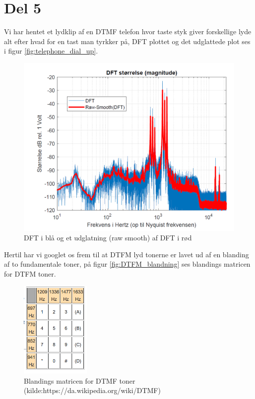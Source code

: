 \section{Del 5}

Vi har hentet et lydklip af en DTMF telefon hvor taste styk giver forskellige lyde alt efter hvad for en tast man tyrkker på, DFT plottet og det udglattede plot ses i figur  \autoref{fig:telephone_dial_up}.


\begin{figure}[H]
\centering
\includegraphics[width=\textwidth]{"figures/opgave5_1.png"}
\caption{DFT i blå og et udglatning (raw smooth) af DFT i rød}
\label{fig:telephone_dial_up}
\end{figure}

Hertil har vi googlet os frem til at DTFM lyd tonerne er lavet ud af en blanding af to fundamentale toner, på figur \autoref{fig:DTFM_blandning} ses blandings matricen for DTFM toner. 

\begin{figure}[H]
\centering
\includegraphics[width=0.3\textwidth]{"figures/DTFM.png"}
\caption{Blandings matricen for DTMF toner (kilde:https://da.wikipedia.org/wiki/DTMF)}
\label{fig:DTFM_blandning}
\end{figure}

